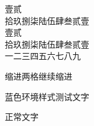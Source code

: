 \documentclass{ltc-guji}
\begin{document}
\begin{正文}
壹贰\\
拾玖捌柒陆伍肆叁贰壹\\

壹贰\\
拾玖捌柒陆伍肆叁贰壹\\

一二三 四五六七八九

\begin{段落}[indent=2]
缩进两格继续缩进
\end{段落}

\begin{StyleEnv}[font-color=blue]
蓝色环境样式测试文字
\end{StyleEnv}
正常文字

\end{正文}
\end{document}

